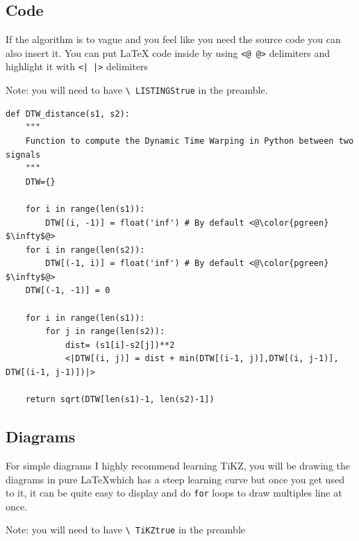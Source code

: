 \documentclass{project-logbook}
\begin{document}
{%

\subsection{Code} %
\label{sub:code}

\begin{tip}
If the algorithm is to vague and you feel like you need the source code you can also insert it. You can put LaTeX code inside by using \texttt{<@ @>} delimiters and highlight it with \texttt{<| |>} delimiters

Note: you will need to have \texttt{\textbackslash
LISTINGStrue} in the preamble.
\end{tip}

\begin{lstlisting}[style=Python]
def DTW_distance(s1, s2):
    """
    Function to compute the Dynamic Time Warping in Python between two signals
    """
    DTW={}

    for i in range(len(s1)):
        DTW[(i, -1)] = float('inf') # By default <@\color{pgreen} $\infty$@>
    for i in range(len(s2)):
        DTW[(-1, i)] = float('inf') # By default <@\color{pgreen} $\infty$@>
    DTW[(-1, -1)] = 0

    for i in range(len(s1)):
        for j in range(len(s2)):
            dist= (s1[i]-s2[j])**2
            <|DTW[(i, j)] = dist + min(DTW[(i-1, j)],DTW[(i, j-1)], DTW[(i-1, j-1)])|>

    return sqrt(DTW[len(s1)-1, len(s2)-1])
\end{lstlisting}

\clearpage
\subsection{Diagrams} %
\label{sub:diagrams}

\begin{tip}
For simple diagrams I highly recommend learning TiKZ, you will be drawing the diagrams in pure \LaTeX which has a steep learning curve but once you get used to it, it can be quite easy to display and do \texttt{for} loops to draw multiples line at once.

Note: you will need to have \texttt{\textbackslash
TiKZtrue} in the preamble
\end{tip}

\begin{figure}[!h]
\centering
{}


\end{figure}}
\end{document}
